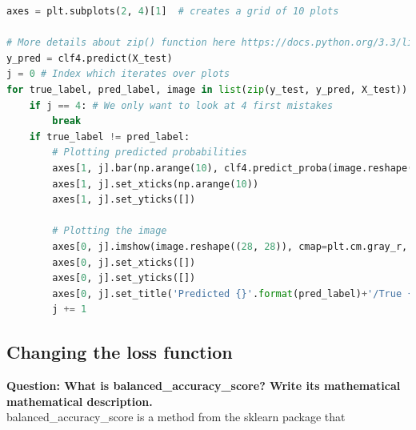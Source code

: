 \begin{lstlisting}[language=Python]
axes = plt.subplots(2, 4)[1]  # creates a grid of 10 plots

# More details about zip() function here https://docs.python.org/3.3/library/functions.html#zip
y_pred = clf4.predict(X_test)
j = 0 # Index which iterates over plots
for true_label, pred_label, image in list(zip(y_test, y_pred, X_test)):
    if j == 4: # We only want to look at 4 first mistakes
        break
    if true_label != pred_label:
        # Plotting predicted probabilities
        axes[1, j].bar(np.arange(10), clf4.predict_proba(image.reshape(1, -1))[0]) 
        axes[1, j].set_xticks(np.arange(10))
        axes[1, j].set_yticks([])
        
        # Plotting the image
        axes[0, j].imshow(image.reshape((28, 28)), cmap=plt.cm.gray_r, interpolation='nearest')
        axes[0, j].set_xticks([])
        axes[0, j].set_yticks([])
        axes[0, j].set_title('Predicted {}'.format(pred_label)+'/True {}'.format(true_label),fontsize=8)
        j += 1
\end{lstlisting}

\subsection{Changing the loss function}
 
\textbf{Question: What is balanced\_accuracy\_score? Write its mathematical mathematical description.} \\
balanced\_accuracy\_score is a method from the sklearn package that 